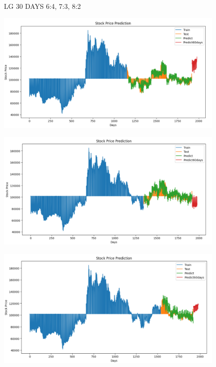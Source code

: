 \documentclass{article}
\begin{document}
\begin{multicols}{2}
\begin{figure}[H]
\begin{minipage}{0.15\textwidth}
    \label{fig:3}
    \end{minipage}
    \caption{LG 30 DAYS  6:4, 7:3, 8:2 }
\end{figure}



\begin{figure}[H]
    \centering
    \begin{minipage}{0.15\textwidth}
    \centering
    \includegraphics[width=1\textwidth]{Image/N_Beat/N_BEAT_6_4_LG_60DAYS.png}
   
    \label{fig:1}
    \end{minipage}%
    \begin{minipage}{0.15\textwidth}
    \centering
    \includegraphics[width=1\textwidth]{Image/N_Beat/N_BEAT_7_3_LG_60DAYS.png}
  
    \label{fig:2}
    \end{minipage}%
    \begin{minipage}{0.15\textwidth}
    \centering
    \includegraphics[width=1\textwidth]{Image/N_Beat/N_BEAT_8_2_LG_60DAYS.png}


\end{minipage}
\end{figure}
\end{multicols}
\end{document}
